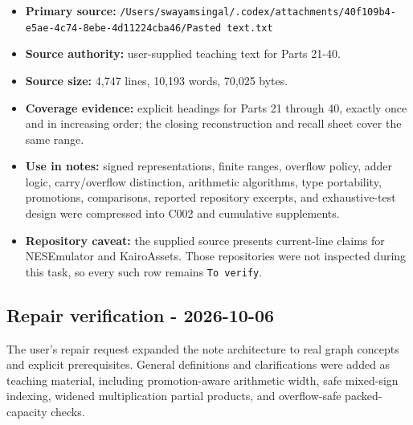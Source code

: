 \begin{itemize}
\tightlist
\item
  \textbf{Primary source:} \texttt{/Users/swayamsingal/.codex/attachments/40f109b4-e5ae-4c74-8ebe-4d11224cba46/Pasted\ text.txt}
\item
  \textbf{Source authority:} user-supplied teaching text for Parts 21-40.
\item
  \textbf{Source size:} 4,747 lines, 10,193 words, 70,025 bytes.
\item
  \textbf{Coverage evidence:} explicit headings for Parts 21 through 40, exactly once and in increasing order; the closing reconstruction and recall sheet cover the same range.
\item
  \textbf{Use in notes:} signed representations, finite ranges, overflow policy, adder logic, carry/overflow distinction, arithmetic algorithms, type portability, promotions, comparisons, reported repository excerpts, and exhaustive-test design were compressed into C002 and cumulative supplements.
\item
  \textbf{Repository caveat:} the supplied source presents current-line claims for NESEmulator and KairoAssets. Those repositories were not inspected during this task, so every such row remains \texttt{To\ verify}.
\end{itemize}

\subsection{Repair verification - 2026-10-06}\label{appendix-a103e7846d21-repair-verification---2026-10-06}

The user's repair request expanded the note architecture to real graph concepts and explicit prerequisites. General definitions and clarifications were added as teaching material, including promotion-aware arithmetic width, safe mixed-sign indexing, widened multiplication partial products, and overflow-safe packed-capacity checks.

